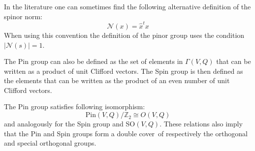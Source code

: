 	\begin{remark}
		In the literature one can sometimes find the following alternative definition of the spinor norm:
		\begin{equation}
			\mathcal{N}(x) = \hat{x}^tx
		\end{equation}
		When using this convention the definition of the pinor group uses the condition $|\mathcal{N}(s)| = 1$.
	\end{remark}

	\begin{adefinition}
		The Pin group can also be defined as the set of elements in $\Gamma(V, Q)$ that can be written as a product of unit Clifford vectors. The Spin group is then defined as the elements that can be written as the product of an even number of unit Clifford vectors.
	\end{adefinition}
	
	\begin{property}
		The Pin group satisfies following isomorphism:
		\begin{equation}
			\text{Pin}(V, Q)/\mathbb{Z}_2 \cong O(V, Q)
		\end{equation}
		and analogously for the Spin group and SO$(V, Q)$. These relations also imply that the Pin and Spin groups form a double cover\footnotemark\ of respectively the orthogonal and special orthogonal groups.
	\end{property}
	
